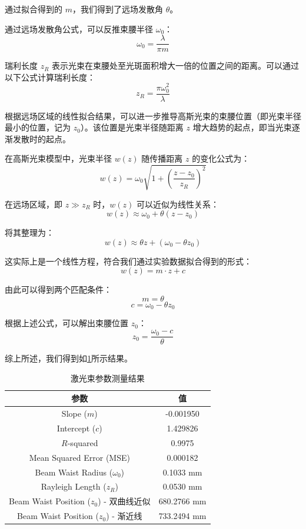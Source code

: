 \begin{enumerate}
\begin{enumerate}
		通过拟合得到的 \(m\)，我们得到了远场发散角 \(\theta\)。
		
		通过远场发散角公式，可以反推束腰半径 \(\omega_0\)：
		\[
		\omega_0 = \frac{\lambda}{\pi m}
		\]
		
		瑞利长度 \(z_R\) 表示光束在束腰处至光斑面积增大一倍的位置之间的距离。可以通过以下公式计算瑞利长度：
		\[
		z_R = \frac{\pi \omega_0^2}{\lambda}
		\]
		
		根据远场区域的线性拟合结果，可以进一步推导高斯光束的束腰位置（即光束半径最小的位置，记为 \(z_0\)）。该位置是光束半径随距离 \(z\) 增大趋势的起点，即当光束逐渐发散时的起点。
		
		在高斯光束模型中，光束半径 \(w(z)\) 随传播距离 \(z\) 的变化公式为：
		\[
		w(z) = \omega_0 \sqrt{1 + \left(\frac{z - z_0}{z_R}\right)^2}
		\]
		
		在远场区域，即 \(z \gg z_R\) 时，\(w(z)\) 可以近似为线性关系：
		\[
		w(z) \approx \omega_0 + \theta (z - z_0)
		\]
		
		将其整理为：
		\[
		w(z) \approx \theta z + \left(\omega_0 - \theta z_0\right)
		\]
		
		这实际上是一个线性方程，符合我们通过实验数据拟合得到的形式：
		\[
		w(z) = m \cdot z + c
		\]
		
		由此可以得到两个匹配条件：
		\[
		m = \theta
		\]
		\[
		c = \omega_0 - \theta z_0
		\]
		
		根据上述公式，可以解出束腰位置 \(z_0\)：
		\[
		z_0 = \frac{\omega_0 - c}{\theta}
		\]
		
		综上所述，我们得到如\cref{tab:exp4-a-nolens-linear}所示结果。
		
		\begin{table}[h!]
			\centering
			\caption{激光束参数测量结果}
			\label{tab:exp4-a-nolens-linear}
			\begin{tabular}{|c|c|}
				\hline
				\textbf{参数}                     & \textbf{值} \\ \hline
				Slope ($m$)                       & -0.001950  \\ \hline
				Intercept ($c$)                   & 1.429826   \\ \hline
				$R$-squared                       & 0.9975     \\ \hline
				Mean Squared Error (MSE)          & 0.000182   \\ \hline
				Beam Waist Radius ($\omega_0$)    & 0.1033 mm  \\ \hline
				Rayleigh Length ($z_R$)           & 0.0530 mm  \\ \hline
				Beam Waist Position ($z_0$) - 双曲线近似  & 680.2766 mm \\ \hline
				Beam Waist Position ($z_0$) - 渐近线 & 733.2494 mm \\ \hline
			\end{tabular}
		\end{table}
		

\end{enumerate}
\end{enumerate}
